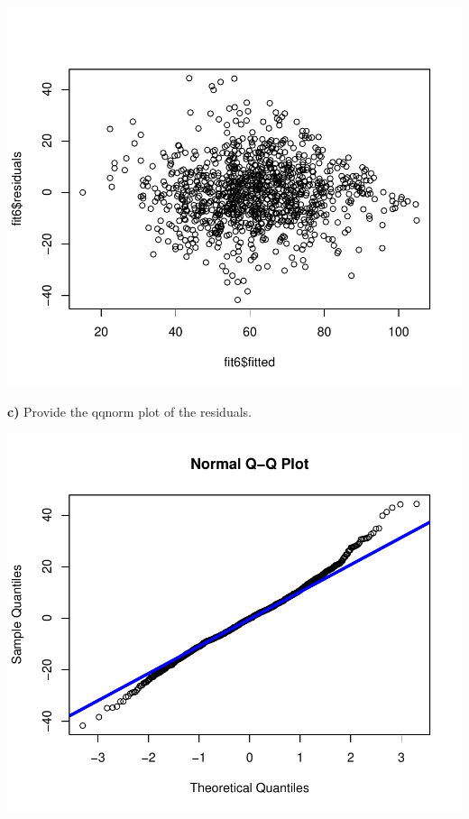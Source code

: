 \documentclass[]{article}
\newenvironment{Shaded}{\begin{snugshade}}{\end{snugshade}}
\newcommand{\KeywordTok}[1]{\textcolor[rgb]{0.13,0.29,0.53}{\textbf{#1}}}
\newcommand{\DataTypeTok}[1]{\textcolor[rgb]{0.13,0.29,0.53}{#1}}
\newcommand{\DecValTok}[1]{\textcolor[rgb]{0.00,0.00,0.81}{#1}}
\newcommand{\StringTok}[1]{\textcolor[rgb]{0.31,0.60,0.02}{#1}}
\newcommand{\CommentTok}[1]{\textcolor[rgb]{0.56,0.35,0.01}{\textit{#1}}}
\newcommand{\OperatorTok}[1]{\textcolor[rgb]{0.81,0.36,0.00}{\textbf{#1}}}
\newcommand{\NormalTok}[1]{#1}
\begin{document}
\begin{flushleft}\includegraphics{Midterm_11_01_2016_Answers_files/figure-latex/unnamed-chunk-45-1} \end{flushleft}

\textbf{c)} Provide the qqnorm plot of the residuals.

\begin{Shaded}
\end{Shaded}

\begin{flushleft}\includegraphics{Midterm_11_01_2016_Answers_files/figure-latex/unnamed-chunk-46-1} \end{flushleft}
\end{document}
